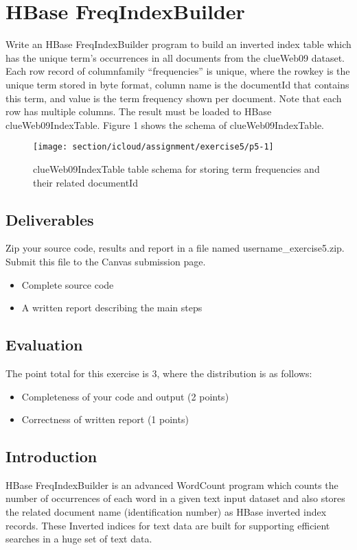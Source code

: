 \section*{HBase FreqIndexBuilder}


Write an HBase FreqIndexBuilder program to build an inverted index table which
has the unique term's occurrences in all documents from the clueWeb09 dataset.
Each row record of columnfamily ``frequencies'' is unique, where the rowkey is
the unique term stored in byte format, column name is the documentId that
contains this term, and value is the term frequency shown per document. Note
that each row has multiple columns. The result must be loaded to HBase
clueWeb09IndexTable. Figure 1 shows the schema of clueWeb09IndexTable.

\begin{figure}[!htbp]
\texttt{[image: section/icloud/assignment/exercise5/p5-1]}
\centering
\caption{clueWeb09IndexTable table schema for storing term frequencies and their related documentId}
\end{figure}

\subsection*{Deliverables}
Zip your source code, results and report in a file named
username\_exercise5.zip. Submit this file to the Canvas submission page.

\begin{itemize}
\item Complete source code
\item A written report describing the main steps
\end{itemize}

\subsection*{Evaluation}
The point total for this exercise is 3, where the distribution is as follows:
\begin{itemize}
\item Completeness of your code and output (2 points)
\item Correctness of written report (1 points)
\end{itemize}

\subsection*{Introduction}
HBase FreqIndexBuilder is an advanced WordCount program which counts the number
of occurrences of each word in a given text input dataset and also stores the
related document name (identification number) as HBase inverted index records.
These Inverted indices for text data are built for supporting efficient
searches in a huge set of text data.

